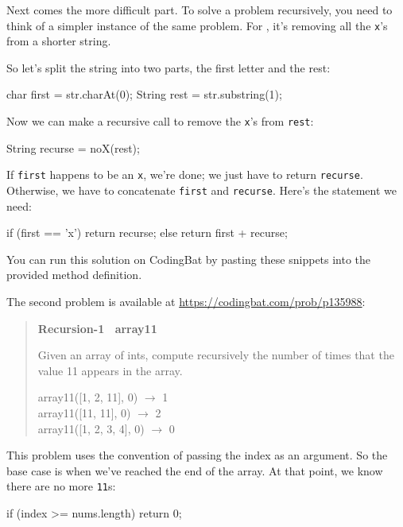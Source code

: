 
Next comes the more difficult part.
To solve a problem recursively, you need to think of a simpler instance of the same problem.
For , it's removing all the {\tt x}'s from a shorter string.

So let's split the string into two parts, the first letter and the rest:

\begin{code}
char first = str.charAt(0);
String rest = str.substring(1);
\end{code}

Now we can make a recursive call to remove the {\tt x}'s from {\tt rest}:

\begin{code}
String recurse = noX(rest);
\end{code}

If {\tt first} happens to be an {\tt x}, we're done; we just have to return {\tt recurse}.
Otherwise, we have to concatenate {\tt first} and {\tt recurse}.
Here's the  statement we need:

\begin{code}
if (first == 'x') {
    return recurse;
} else {
    return first + recurse;
}
\end{code}

You can run this solution on CodingBat by pasting these snippets into the provided method definition.

The second problem is available at \url{https://codingbat.com/prob/p135988}:

\begin{quote}
\textbf{Recursion-1 ~array11}

Given an array of ints, compute recursively the number of times that the value 11 appears in the array.

\ttfamily
array11([1, 2, 11], 0) $\rightarrow$ 1 \\
array11([11, 11], 0) $\rightarrow$ 2 \\
array11([1, 2, 3, 4], 0) $\rightarrow$ 0
\end{quote}

This problem uses the convention of passing the index as an argument.
So the base case is when we've reached the end of the array.
At that point, we know there are no more {\tt 11}s:

\begin{code}
if (index >= nums.length) {
    return 0;
}
\end{code}

